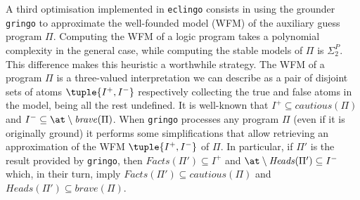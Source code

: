 \documentclass{new_tlp}
\def\eclingo{{\tt eclingo}}
\def\Facts{\mathit{Facts}}
\def\Heads{\mathit{Heads}}
\begin{document}
A third optimisation implemented in \eclingo{} consists in using the grounder {\tt gringo} to approximate the well-founded model (WFM) of the auxiliary guess program $\Pi$.
%
Computing the WFM of a logic program takes a polynomial complexity in the general case, while computing the stable models of $\Pi$ is $\Sigma^{P}_{2}$. This difference makes this heuristic a worthwhile strategy. 
%
The WFM of a program $\Pi$ is a three-valued interpretation we can describe as a pair of disjoint sets of atoms $\tuple{I^+,I^-}$ respectively collecting the true and false atoms in the model, being all the rest undefined.
%
It is well-known that $I^+ \subseteq \mathit{cautious}(\Pi)$ and $I^- \subseteq \at \setminus \mathit{brave}(\Pi)$.
%
When {\tt gringo} processes any program $\Pi$ (even if it is originally ground) it performs some simplifications that allow retrieving an approximation of the WFM $\tuple{I^+,I^-}$ of $\Pi$.
%
In particular, if $\Pi'$ is the result provided by {\tt gringo}, then $\Facts(\Pi') \subseteq I^+$ and $\at \setminus \Heads(\Pi') \subseteq I^-$ which, in their turn, imply $\Facts(\Pi') \subseteq \mathit{cautious}(\Pi)$ and $\Heads(\Pi') \subseteq \mathit{brave}(\Pi)$.
%
%
\end{document}

